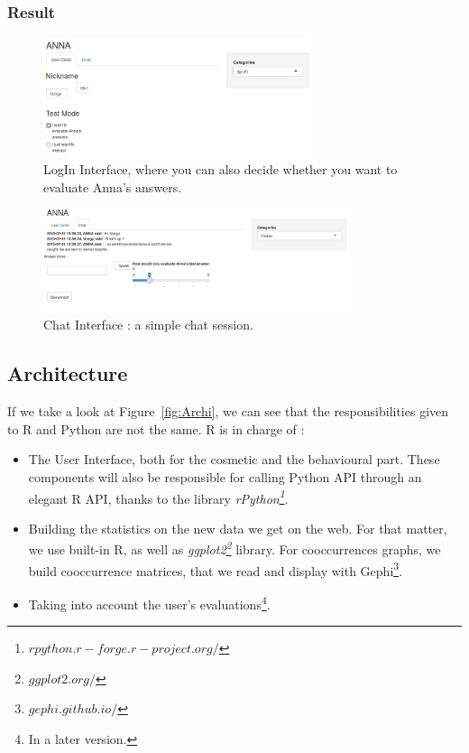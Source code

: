 \newpage
\subsubsection{Result}
\label{subs:Result}

\begin{figure}[!h]
\begin{center}
\includegraphics[width=0.70\textwidth]{./img/AnnaLoginUI.png}
\end{center}
\caption{LogIn Interface, where you can also decide whether you want to evaluate Anna's answers.}
\label{fig:AnnaLoginUI}
\end{figure}

\begin{figure}[!h]
\begin{center}
\includegraphics[width=0.80\textwidth]{./img/AnnaChatUI.png}
\end{center}
\caption{Chat Interface : a simple chat session.}
\label{fig:AnnaChatUI}
\end{figure}

\subsection{Architecture}
\label{sub:Architecture}

If we take a look at Figure~\ref{fig:Archi}, we can see that the responsibilities given to R and Python are not the same.
R is in charge of :
\begin{itemize}
    \item The User Interface, both for the cosmetic and the behavioural part.
    These components will also be responsible for calling Python API through an elegant R API, thanks to the library \textit{rPython\footnote{$rpython.r-forge.r-project.org/$}}.
    \item Building the statistics on the new data we get on the web.
    For that matter, we use built-in R, as well as \textit{ggplot2\footnote{$ggplot2.org/$}} library.
    For cooccurrences graphs, we build cooccurrence matrices, that we read and display with Gephi\footnote{$gephi.github.io/$}.
    \item Taking into account the user's evaluations\footnote{In a later version.}.
\end{itemize}

